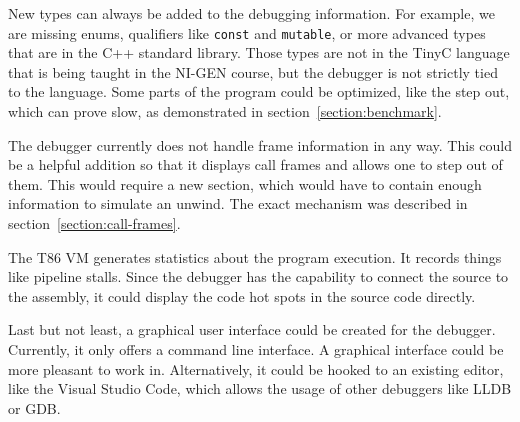 New types can always be added to the debugging information. For example, we are
missing enums, qualifiers like \texttt{const} and \texttt{mutable}, or more
advanced types that are in the C++ standard library. Those types are not in the
TinyC language that is being taught in the NI-GEN course, but the debugger is
not strictly tied to the language. Some parts of the program could be
optimized, like the step out, which can prove slow, as demonstrated in
section~\ref{section:benchmark}.

The debugger currently does not handle frame information in any way. This could
be a helpful addition so that it displays call frames and allows one to step
out of them. This would require a new section, which would have to contain
enough information to simulate an unwind. The exact mechanism was described in
section~\ref{section:call-frames}.

The T86 VM generates statistics about the program execution. It records things
like pipeline stalls. Since the debugger has the capability to connect the
source to the assembly, it could display the code hot spots in the source code
directly.

Last but not least, a graphical user interface could be created for the
debugger. Currently, it only offers a command line interface. A graphical
interface could be more pleasant to work in. Alternatively, it could be hooked
to an existing editor, like the Visual Studio Code, which allows the usage of
other debuggers like LLDB or GDB.
